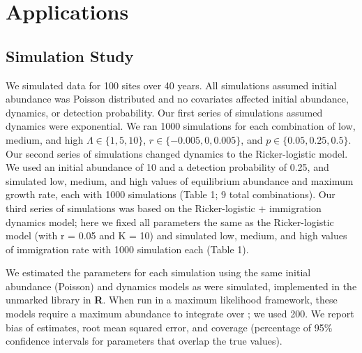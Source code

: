 \documentclass[12pt]{article}
\begin{document}
\section{Applications}
\label{sec:app}

\subsection{Simulation Study}


We simulated data for 100 sites over 40 years.  All
simulations assumed initial abundance was Poisson distributed
and no covariates affected initial abundance, dynamics, or
detection probability.  Our first series of simulations
assumed dynamics were exponential.  We ran 1000 simulations for
each combination of low, medium, and high $\Lambda \in
\{1,5,10\}$, $r \in \{-0.005, 0, 0.005\}$, and
$p \in \{0.05, 0.25, 0.5\}$. %
Our second series of simulations changed dynamics to the Ricker-logistic
model. We used an initial abundance of 10 and a detection probability
of 0.25, and simulated low, medium, and high values of equilibrium
abundance and maximum growth rate, each with 1000 simulations (Table 1;
9 total combinations). Our third series of simulations was based
on the Ricker-logistic + immigration dynamics model; here we fixed all
parameters the same as the Ricker-logistic model (with r = 0.05 and K = 10) and
simulated low, medium, and high values of immigration rate with 1000
simulation each (Table 1).

We estimated the parameters for each simulation using the same
initial abundance (Poisson) and dynamics models as were
simulated, implemented in the unmarked library in \textbf{R}.
When run in a maximum likelihood framework, these models require a
maximum abundance to integrate over
\citep{royle:2004biom,dail_madsen:2011};
we used 200.  We report bias of estimates, root
mean squared error, and coverage (percentage of 95\% confidence
intervals for parameters that overlap the true values).

\end{document}
